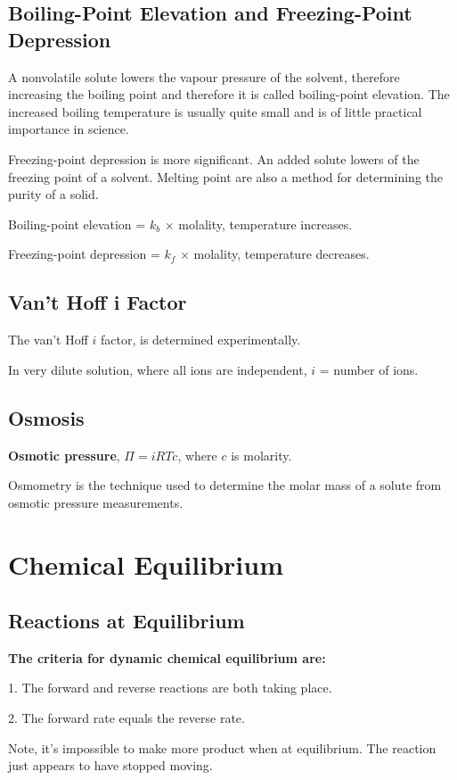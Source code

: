 \documentclass[a4paper,12pt]{article}
\begin{document}
\subsection{Boiling-Point Elevation and Freezing-Point Depression}
A nonvolatile solute lowers the vapour pressure of the solvent, therefore increasing the boiling point and therefore it is called boiling-point elevation. The increased boiling temperature is usually quite small and is of little practical importance in science.\par
Freezing-point depression is more significant. An added solute lowers of the freezing point of a solvent. Melting point are also a method for determining the purity of a solid.\par
Boiling-point elevation = $k_{b}$ × molality, temperature increases.\par
Freezing-point depression = $k_{f}$ × molality, temperature decreases.
\subsection{Van't Hoff i Factor}
The van't Hoff $i$ factor, is determined experimentally.\par
In very dilute solution, where all ions are independent, $i$ = number of ions.
\subsection{Osmosis}
\textbf{Osmotic pressure}, $\Pi = iRTc$, where $c$ is molarity.\par
Osmometry is the technique used to determine the molar mass of a solute from osmotic pressure measurements.


\newpage
\section{Chemical Equilibrium}
\subsection{Reactions at Equilibrium}
\textbf{The criteria for dynamic chemical equilibrium are:}\par
1. The forward and reverse reactions are both taking place.\par
2. The forward rate equals the reverse rate.\par
Note, it’s impossible to make more product when at equilibrium. The reaction just appears to have stopped moving.
\end{document}
